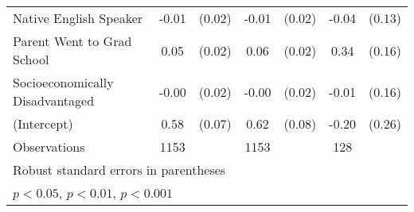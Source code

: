 {\begin{tabular}{l*{3}{cc}}
Native English Speaker&       -0.01         &      (0.02)&       -0.01         &      (0.02)&       -0.04         &      (0.13)\\
Parent Went to Grad School&        0.05\sym{*}  &      (0.02)&        0.06\sym{*}  &      (0.02)&        0.34\sym{*}  &      (0.16)\\
Socioeconomically Disadvantaged&       -0.00         &      (0.02)&       -0.00         &      (0.02)&       -0.01         &      (0.16)\\
(Intercept)         &        0.58\sym{***}&      (0.07)&        0.62\sym{***}&      (0.08)&       -0.20         &      (0.26)\\
\midrule
Observations        &        1153         &            &        1153         &            &         128         &            \\
\bottomrule
\multicolumn{7}{l}{\footnotesize Robust standard errors in parentheses}\\
\multicolumn{7}{l}{\footnotesize \sym{*} \(p<0.05\), \sym{**} \(p<0.01\), \sym{***} \(p<0.001\)}\\
\end{tabular}
}
